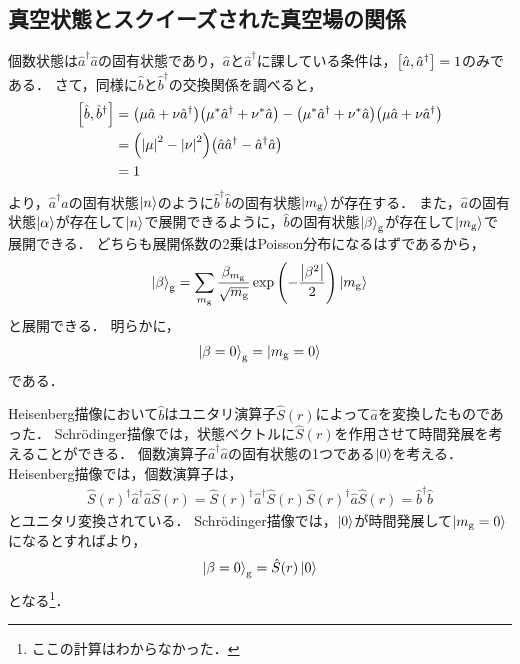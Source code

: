 \documentclass{report}
\begin{document}
  \subsection{真空状態とスクイーズされた真空場の関係}
    個数状態は$\hat{a}^{\dag}\hat{a}$の固有状態であり，$\hat{a}$と$\hat{a}^{\dag}$に課している条件は，$\qty[\hat{a}, \hat{a}^{\dag}] = 1$のみである．
    さて，同様に$\hat{b}$と$\hat{b}^{\dag}$の交換関係を調べると，
    \begin{align}
      \qty[\hat{b}, \hat{b}^{\dag}] &= \qty(\mu\hat{a} + \nu\hat{a}^{\dag})\qty(\mu^*\hat{a}^{\dag} + \nu^*\hat{a}) - \qty(\mu^*\hat{a}^{\dag} + \nu^*\hat{a})\qty(\mu\hat{a} + \nu\hat{a}^{\dag}) \\ 
      &= \qty(\abs{\mu}^2 - \abs{\nu}^2)\qty(\hat{a}\hat{a}^{\dag} - \hat{a}^{\dag}\hat{a}) \\ 
      &= 1
    \end{align}
    より，$\hat{a}^{\dag}\hat{a}$の固有状態$\ket{n}$のように$\hat{b}^{\dag}\hat{b}$の固有状態$\ket{m_{\mathrm{g}}}$が存在する．
    また，$\hat{a}$の固有状態$\ket{\alpha}$が存在して$\ket{n}$で展開できるように，$\hat{b}$の固有状態$\ket{\beta}_{\mathrm{g}}$が存在して$\ket{m_{\mathrm{g}}}$で展開できる．
    どちらも展開係数の2乗はPoisson分布になるはずであるから，
    \begin{align}
      \ket{\beta}_{\mathrm{g}} = \sum_{m_{\mathrm{g}}}\frac{\beta_{m_{\mathrm{g}}}}{\sqrt{m_{\mathrm{g}}}}\exp\qty(-\frac{\abs{\beta^2}}{2})\ket{m_{\mathrm{g}}}
    \end{align}
    と展開できる．
    明らかに，
    \begin{align}
      \ket{\beta = 0}_{\mathrm{g}} = \ket{m_{\mathrm{g}} = 0}\label{bg-mg-relation}
    \end{align}
    である．
    \par
    Heisenberg描像において$\hat{b}$はユニタリ演算子$\hat{S}(r)$によって$\hat{a}$を変換したものであった．
    Schr\"odinger描像では，状態ベクトルに$\hat{S}(r)$を作用させて時間発展を考えることができる．
    個数演算子$\hat{a}^{\dag}\hat{a}$の固有状態の1つである$\ket{0}$を考える．
    Heisenberg描像では，個数演算子は，
    \begin{align}
      \hat{S}(r)^{\dag}\hat{a}^{\dag}\hat{a}\hat{S}(r) = \hat{S}(r)^{\dag}\hat{a}^{\dag}\hat{S}(r)\hat{S}(r)^{\dag}\hat{a}\hat{S}(r) = \hat{b}^{\dag}\hat{b}
    \end{align}
    とユニタリ変換されている．
    Schr\"odinger描像では，$\ket{0}$が時間発展して$\ket{m_{\mathrm{g}} = 0}$になるとすればより，
    \begin{align}
      \ket{\beta = 0}_{\mathrm{g}} = \hat{S}(r)\ket{0}
    \end{align}
    となる\footnote{ここの計算はわからなかった．}．
\end{document}
